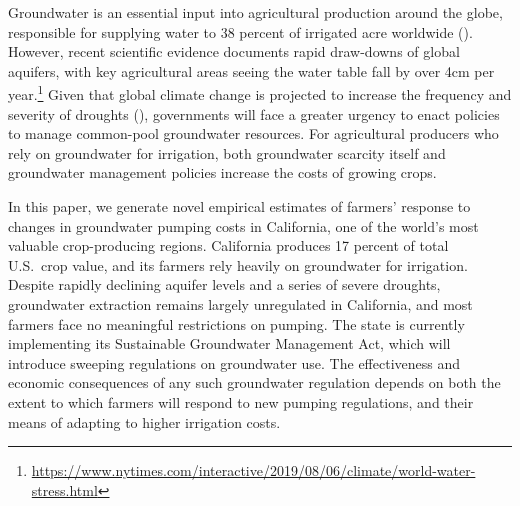 %
%
Groundwater is an essential input into agricultural production around the globe, responsible for supplying water to 38 percent of irrigated acre worldwide (\textcite{siebert2010}). However, recent scientific evidence documents rapid draw-downs of global aquifers, with key agricultural areas seeing the water table fall by over 4cm per year.\footnote{\url{https://www.nytimes.com/interactive/2019/08/06/climate/world-water-stress.html}} Given that global climate change is projected to increase the frequency and severity of droughts (\textcite{famiglietti2014}), governments will face a greater urgency to enact policies to manage common-pool groundwater resources. For agricultural producers who rely on groundwater for irrigation, both groundwater scarcity itself and groundwater management policies increase the costs of growing crops.

In this paper, we generate novel empirical estimates of farmers' response to changes in groundwater pumping costs in California, one of the world's most valuable crop-producing regions. California produces 17 percent of total U.S.\ crop value, and its farmers rely heavily on groundwater for irrigation. Despite rapidly declining aquifer levels and a series of severe droughts, groundwater extraction remains largely unregulated in California, and most farmers face no meaningful restrictions on pumping. The state is currently implementing its Sustainable Groundwater Management Act, which will introduce sweeping regulations on groundwater use. %
The effectiveness and economic consequences of any such groundwater regulation depends on both the extent to which farmers will respond to new pumping regulations, and their means of adapting to higher irrigation costs.

